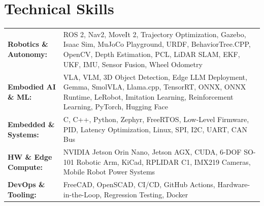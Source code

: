 \documentclass[10.5pt,letterpaper]{article}
\begin{document}
\section*{Technical Skills}
{\renewcommand{\arraystretch}{1.3}
\begin{tabularx}{\textwidth}{@{}p{}>{\arraybackslash\raggedright}X@{}}

\textbf{Robotics \& Autonomy:} & ROS 2, Nav2, MoveIt 2, Trajectory Optimization, Gazebo, Isaac Sim, MuJoCo Playground, URDF, BehaviorTree.CPP, OpenCV, Depth Estimation, PCL, LiDAR SLAM, EKF, UKF, IMU, Sensor Fusion, Wheel Odometry \tabularnewline

\textbf{Embodied AI \& ML:} & VLA, VLM, 3D Object Detection, Edge LLM Deployment, Gemma, SmolVLA, Llama.cpp, TensorRT, ONNX, ONNX Runtime, LeRobot, Imitation Learning, Reinforcement Learning, PyTorch, Hugging Face \tabularnewline

\textbf{Embedded \& Systems:} & C, C++, Python, Zephyr, FreeRTOS, Low-Level Firmware, PID, Latency Optimization, Linux, SPI, I2C, UART, CAN Bus \tabularnewline

\textbf{HW \& Edge Compute:} & NVIDIA Jetson Orin Nano, Jetson AGX, CUDA, 6-DOF SO-101 Robotic Arm, KiCad, RPLIDAR C1, IMX219 Cameras, Mobile Robot Power Systems \tabularnewline

\textbf{DevOps \& Tooling:} & FreeCAD, OpenSCAD, CI/CD, GitHub Actions, Hardware-in-the-Loop, Regression Testing, Docker \tabularnewline

\end{tabularx}}


\end{document}
